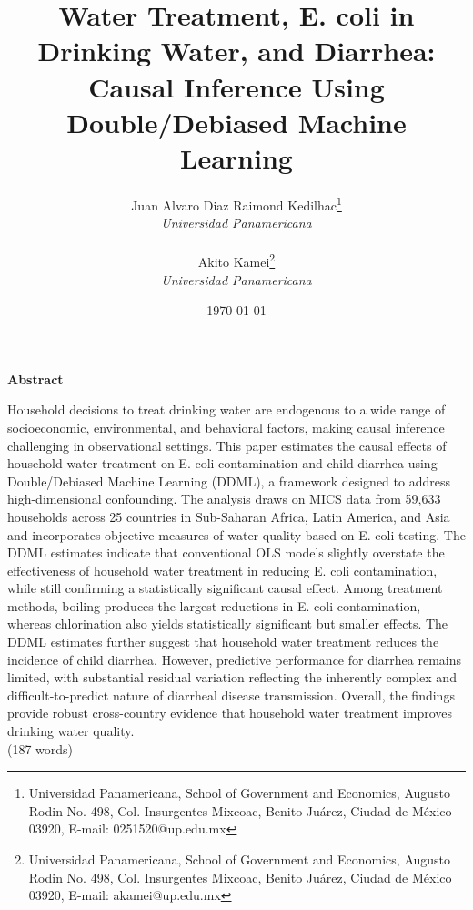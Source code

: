\documentclass [11pt]{article}
\theoremstyle{plain}
\theoremstyle{definition}
\theoremstyle{remark}
\newcommand{\1}{\bm{1}}
\begin{document}
\title{Water Treatment, E. coli in Drinking Water, and Diarrhea:\\
Causal Inference Using Double/Debiased Machine Learning%
}

\author{Juan Alvaro Diaz Raimond Kedilhac\footnote{Universidad Panamericana, School of Government and Economics, Augusto Rodin No. 498, Col. Insurgentes Mixcoac, Benito Juárez, Ciudad de México 03920, E-mail: 0251520@up.edu.mx}\\
\textit{Universidad Panamericana}\\
~\\
Akito Kamei\footnote{Universidad Panamericana, School of Government and Economics, Augusto Rodin No. 498, Col. Insurgentes Mixcoac, Benito Juárez, Ciudad de México 03920, E-mail: akamei@up.edu.mx}\\
\textit{Universidad Panamericana}\\
}
\date{\today}
\maketitle  

\newcommand{\ToTSample}{59,633}
\newcommand{\ToTSelected}{64,420}

\begin{center}
\textbf{Abstract}
\end{center}  
\begin{singlespace}
Household decisions to treat drinking water are endogenous to a wide range of socioeconomic, environmental, and behavioral factors, making causal inference challenging in observational settings. This paper estimates the causal effects of household water treatment on E. coli contamination and child diarrhea using Double/Debiased Machine Learning (DDML), a framework designed to address high-dimensional confounding. The analysis draws on MICS data from \ToTSample{} households across 25 countries in Sub-Saharan Africa, Latin America, and Asia and incorporates objective measures of water quality based on E. coli testing. The DDML estimates indicate that conventional OLS models slightly overstate the effectiveness of household water treatment in reducing E. coli contamination, while still confirming a statistically significant causal effect. Among treatment methods, boiling produces the largest reductions in E. coli contamination, whereas chlorination also yields statistically significant but smaller effects. The DDML estimates further suggest that household water treatment reduces the incidence of child diarrhea. However, predictive performance for diarrhea remains limited, with substantial residual variation reflecting the inherently complex and difficult-to-predict nature of diarrheal disease transmission. Overall, the findings provide robust cross-country evidence that household water treatment improves drinking water quality.
\\(187 words)
\end{singlespace}
\end{document}
